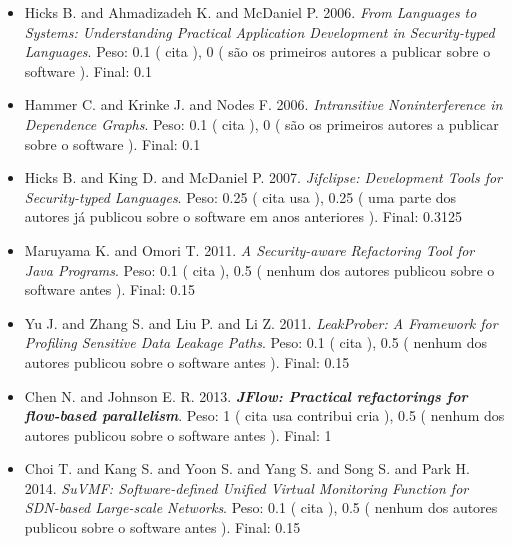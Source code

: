\begin{itemize}
\item Hicks B. and Ahmadizadeh K. and McDaniel P.
      2006.
        \textit{ From Languages to Systems: Understanding Practical Application Development in Security-typed Languages}.
      Peso:
      0.1 (
          cita
      ),
      0 (
são os primeiros autores a publicar sobre o software
      ).
      Final:
      0.1

\item Hammer C. and Krinke J. and Nodes F.
      2006.
        \textit{ Intransitive Noninterference in Dependence Graphs}.
      Peso:
      0.1 (
          cita
      ),
      0 (
são os primeiros autores a publicar sobre o software
      ).
      Final:
      0.1

\item Hicks B. and King D. and McDaniel P.
      2007.
        \textit{ Jifclipse: Development Tools for Security-typed Languages}.
      Peso:
      0.25 (
          cita
          usa
      ),
      0.25 (
uma parte dos autores já publicou sobre o software em anos anteriores
      ).
      Final:
      0.3125

\item Maruyama K. and Omori T.
      2011.
        \textit{ A Security-aware Refactoring Tool for Java Programs}.
      Peso:
      0.1 (
          cita
      ),
      0.5 (
nenhum dos autores publicou sobre o software antes
      ).
      Final:
      0.15

\item Yu J. and Zhang S. and Liu P. and Li Z.
      2011.
        \textit{ LeakProber: A Framework for Profiling Sensitive Data Leakage Paths}.
      Peso:
      0.1 (
          cita
      ),
      0.5 (
nenhum dos autores publicou sobre o software antes
      ).
      Final:
      0.15

\item Chen N. and Johnson E. R.
      2013.
        \textbf{\textit{ JFlow: Practical refactorings for flow-based parallelism}}.
      Peso:
      1 (
          cita
          usa
          contribui
          cria
      ),
      0.5 (
nenhum dos autores publicou sobre o software antes
      ).
      Final:
      1

\item Choi T. and Kang S. and Yoon S. and Yang S. and Song S. and Park H.
      2014.
        \textit{ SuVMF: Software-defined Unified Virtual Monitoring Function for SDN-based Large-scale Networks}.
      Peso:
      0.1 (
          cita
      ),
      0.5 (
nenhum dos autores publicou sobre o software antes
      ).
      Final:
      0.15

\end{itemize}

